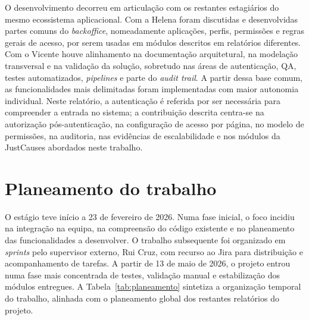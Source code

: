 O desenvolvimento decorreu em articulação com os restantes estagiários do mesmo ecossistema aplicacional. Com a Helena foram discutidas e desenvolvidas partes comuns do \textit{backoffice}, nomeadamente aplicações, perfis, permissões e regras gerais de acesso, por serem usadas em módulos descritos em relatórios diferentes. Com o Vicente houve alinhamento na documentação arquitetural, na modelação transversal e na validação da solução, sobretudo nas áreas de autenticação, \gls{QA}, testes automatizados, \textit{pipelines} e parte do \textit{audit trail}. A partir dessa base comum, as funcionalidades mais delimitadas foram implementadas com maior autonomia individual. Neste relatório, a autenticação é referida por ser necessária para compreender a entrada no sistema; a contribuição descrita centra-se na autorização pós-autenticação, na configuração de acesso por página, no modelo de permissões, na auditoria, nas evidências de escalabilidade e nos módulos da JustCauses abordados neste trabalho.

\section{Planeamento do trabalho}
\label{sec:planeamento}

O estágio teve início a 23 de fevereiro de 2026. Numa fase inicial, o foco incidiu na integração na equipa, na compreensão do código existente e no planeamento das funcionalidades a desenvolver. O trabalho subsequente foi organizado em \textit{sprints} pelo supervisor externo, Rui Cruz, com recurso ao Jira para distribuição e acompanhamento de tarefas. A partir de 13 de maio de 2026, o projeto entrou numa fase mais concentrada de testes, validação manual e estabilização dos módulos entregues. A Tabela~\ref{tab:planeamento} sintetiza a organização temporal do trabalho, alinhada com o planeamento global dos restantes relatórios do projeto.

